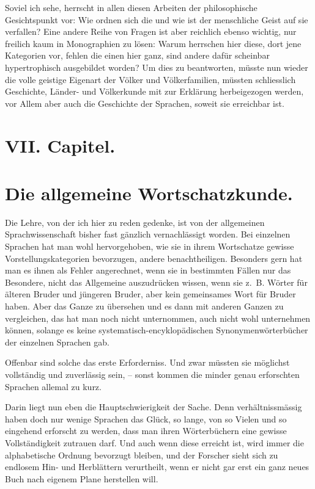 Soviel ich sehe, herrscht in allen diesen Arbeiten der philosophische Gesichtspunkt vor: Wie ordnen sich die  und wie ist der menschliche Geist auf sie verfallen? Eine andere Reihe von Fragen ist aber reichlich ebenso wichtig, nur freilich kaum in Monographien zu lösen: Warum herrschen hier diese, dort jene Kategorien vor, fehlen die einen hier ganz, sind andere dafür scheinbar hypertrophisch ausgebildet worden? Um dies zu beantworten, müsste nun wieder die volle geistige Eigenart der Völker und Völkerfamilien, müssten schliesslich Geschichte, Länder- und Völkerkunde mit zur Erklärung herbeigezogen werden, vor Allem aber auch die Geschichte der Sprachen, soweit sie erreichbar ist.

\section*{VII. Capitel.}\label{IV.VII}
\section*{Die allgemeine Wortschatzkunde.}

Die Lehre, von der ich hier zu reden gedenke, ist von der allgemeinen Sprachwissenschaft bisher fast gänzlich vernachlässigt worden. Bei einzelnen Sprachen hat man wohl hervorgehoben, wie sie in ihrem Wortschatze gewisse Vorstellungskategorien bevorzugen, andere benachtheiligen. Besonders gern hat man es ihnen als Fehler angerechnet, wenn sie in bestimmten Fällen nur das Besondere, nicht das Allgemeine auszudrücken wissen, wenn sie z.~B. Wörter für älteren Bruder und jüngeren Bruder, aber kein gemeinsames Wort für Bruder haben. Aber \label{fp.463} das Ganze zu übersehen und es dann mit anderen Ganzen zu vergleichen, das hat man noch nicht unternommen, auch nicht wohl unternehmen können, solange es keine systematisch-encyklopädischen Synonymenwörterbücher der einzelnen Sprachen gab.

Offenbar sind solche das erste Erforderniss. Und zwar müssten sie möglichst vollständig und zuverlässig sein, – sonst kommen die minder genau erforschten Sprachen allemal zu kurz.

\largerpage
Darin liegt nun eben die Hauptschwierigkeit der Sache. Denn verhältnissmässig haben doch nur wenige Sprachen das Glück, so lange, von so Vielen \label{sp.483} und so eingehend erforscht zu werden, dass man ihren Wörterbüchern eine gewisse Vollständigkeit zutrauen darf. Und auch wenn diese erreicht ist, wird immer die alphabetische Ordnung bevorzugt bleiben, und der Forscher sieht sich zu endlosem Hin- und Herblättern verurtheilt, wenn er nicht gar erst ein ganz neues Buch nach eigenem Plane herstellen will.

